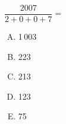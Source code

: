 $\dfrac{2007}{2+0+0+7}=$
\begin{multicols}{5}
  \begin{enumerate}[A)]
  \item 1\,003
  \item 223
  \item 213
  \item 123
  \item 75
  \end{enumerate}
\end{multicols}